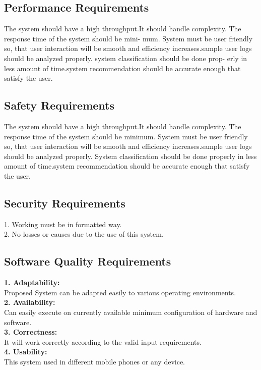 \documentclass[a4paper,12pt]{report}
\begin{document}
\subsection{Performance Requirements}
The system should have a high throughput.It should handle
complexity. The response time of the system should be mini-
mum. System must be user friendly so, that user interaction will
be smooth and efficiency increases.sample user logs should be
analyzed properly. system classification should be done prop-
erly in less amount of time.system recommendation should be
accurate enough that satisfy the user.
\subsection{Safety Requirements}
The system should have a high throughput.It should handle
complexity. The response time of the system should be minimum. System must be user friendly so, that user interaction will
be smooth and efficiency increases.sample user logs should be
analyzed properly. System classification should be done properly in less amount of time.system recommendation should be
accurate enough that satisfy the user.
\subsection{Security Requirements}
1. Working must be in formatted way. \\
2. No losses or causes due to the use of this system. \\
\subsection{Software Quality Requirements}
\textbf{1. Adaptability:}\\ Proposed System can be adapted easily to various
operating environments. \\\newline
\textbf{2. Availability:}\\ Can easily execute on currently available minimum
configuration of hardware and software. \\\newline
\textbf{3. Correctness:}\\ It will work correctly according to the valid input
requirements. \\\newline
\textbf{4. Usability:}\\ This system used in different mobile phones or any
device. \\
\end{document}
